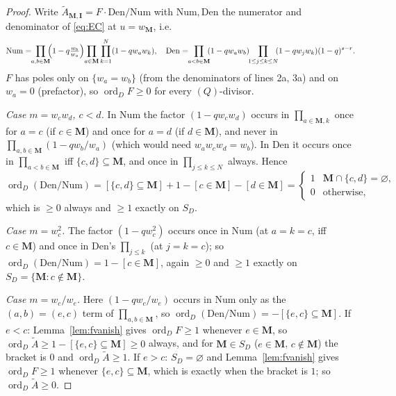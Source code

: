 \documentclass[11pt]{article}
\theoremstyle{definition}
\newcommand{\At}{\widetilde{A}}
\newcommand{\bM}{\mathbf{M}}
\newcommand{\bI}{\mathbf{I}}
\newcommand{\ord}{\operatorname{ord}}
\begin{document}
\begin{proof}
Write $\At_{\bM,\bI}=F\cdot\mathrm{Den}/\mathrm{Num}$ with $\mathrm{Num},
\mathrm{Den}$ the numerator and denominator of \eqref{eq:EC} at $u=w_{\bM}$, i.e.
\[
\mathrm{Num}=\!\!\prod_{a,b\in\bM}\!\!\Bigl(1-q\tfrac{w_b}{w_a}\Bigr)
\!\prod_{a\in\bM}\prod_{k=1}^{N}(1-qw_aw_k),\quad
\mathrm{Den}=\!\!\prod_{a<b\in\bM}\!\!(1-qw_aw_b)\!\!\prod_{1\le j\le k\le N}\!\!(1-qw_jw_k)(1-q)^{s-r}.
\]
$F$ has poles only on $\{w_a=w_b\}$ (from the denominators of lines 2a, 3a) and
on $w_a=0$ (prefactor), so $\ord_D F\ge0$ for every $(Q)$-divisor.

\emph{Case $m=w_cw_d$, $c<d$.}  In $\mathrm{Num}$ the factor $(1-qw_cw_d)$ occurs
in $\prod_{a\in\bM,k}$ once for $a=c$ (if $c\in\bM$) and once for $a=d$ (if
$d\in\bM$), and never in $\prod_{a,b\in\bM}(1-qw_b/w_a)$ (which would need
$w_aw_cw_d=w_b$).  In $\mathrm{Den}$ it occurs once in
$\prod_{a<b\in\bM}$ iff $\{c,d\}\subseteq\bM$, and once in $\prod_{j\le k\le N}$
always.  Hence
\[
  \ord_D(\mathrm{Den}/\mathrm{Num})=[\{c,d\}\subseteq\bM]+1-[c\in\bM]-[d\in\bM]
  =\begin{cases}1&\bM\cap\{c,d\}=\varnothing,\\0&\text{otherwise,}\end{cases}
\]
which is $\ge0$ always and $\ge1$ exactly on $S_D$.

\emph{Case $m=w_c^{2}$.}  The factor $(1-qw_c^{2})$ occurs once in
$\mathrm{Num}$ (at $a=k=c$, iff $c\in\bM$) and once in $\mathrm{Den}$'s
$\prod_{j\le k}$ (at $j=k=c$); so
$\ord_D(\mathrm{Den}/\mathrm{Num})=1-[c\in\bM]$, again $\ge0$ and $\ge1$ exactly
on $S_D=\{\bM:c\notin\bM\}$.

\emph{Case $m=w_c/w_e$.}  Here $(1-qw_c/w_e)$ occurs in $\mathrm{Num}$ only as
the $(a,b)=(e,c)$ term of $\prod_{a,b\in\bM}$, so
$\ord_D(\mathrm{Den}/\mathrm{Num})=-[\{e,c\}\subseteq\bM]$.  If $e<c$:
Lemma~\ref{lem:fvanish} gives $\ord_D F\ge1$ whenever $e\in\bM$, so
$\ord_D\At\ge1-[\{e,c\}\subseteq\bM]\ge0$ always, and for $\bM\in S_D$
($e\in\bM$, $c\notin\bM$) the bracket is $0$ and $\ord_D\At\ge1$.  If $e>c$:
$S_D=\varnothing$ and Lemma~\ref{lem:fvanish} gives $\ord_D F\ge1$ whenever
$\{e,c\}\subseteq\bM$, which is exactly when the bracket is $1$; so
$\ord_D\At\ge0$.
\end{proof}
\end{document}
